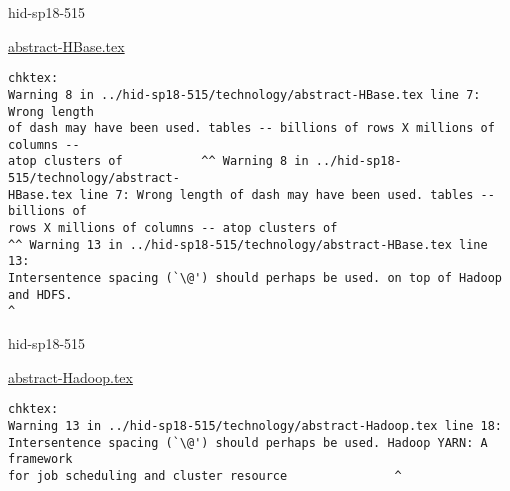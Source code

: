 

\begin{IU}

hid-sp18-515

\href{https://github.com/cloudmesh-community/hid-sp18-515/blob/master//technology/abstract-HBase.tex}{abstract-HBase.tex}

\begin{tiny}
\begin{verbatim}
chktex:
Warning 8 in ../hid-sp18-515/technology/abstract-HBase.tex line 7: Wrong length
of dash may have been used. tables -- billions of rows X millions of columns --
atop clusters of           ^^ Warning 8 in ../hid-sp18-515/technology/abstract-
HBase.tex line 7: Wrong length of dash may have been used. tables -- billions of
rows X millions of columns -- atop clusters of
^^ Warning 13 in ../hid-sp18-515/technology/abstract-HBase.tex line 13:
Intersentence spacing (`\@') should perhaps be used. on top of Hadoop and HDFS.
^
\end{verbatim}
\end{tiny}
\end{IU}



\begin{IU}

hid-sp18-515

\href{https://github.com/cloudmesh-community/hid-sp18-515/blob/master//technology/abstract-Hadoop.tex}{abstract-Hadoop.tex}

\begin{tiny}
\begin{verbatim}
chktex:
Warning 13 in ../hid-sp18-515/technology/abstract-Hadoop.tex line 18:
Intersentence spacing (`\@') should perhaps be used. Hadoop YARN: A framework
for job scheduling and cluster resource               ^
\end{verbatim}
\end{tiny}
\end{IU}



